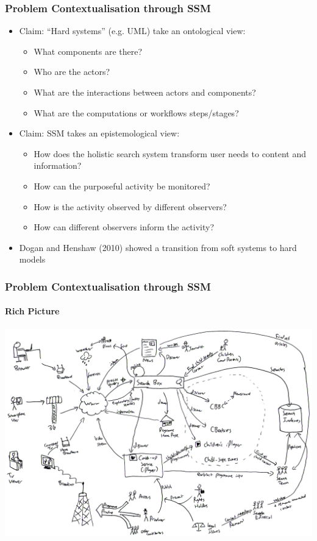 \documentclass{beamer}
\begin{document}
\begin{frame}
  \frametitle{Problem Contextualisation through SSM}
  \begin{itemize}
    \item Claim: ``Hard systems'' (e.g. UML) take an ontological view:
    \begin{itemize}
      \item What components are there?
      \item Who are the actors?
      \item What are the interactions between actors and components?
      \item What are the computations or workflows steps/stages?
    \end{itemize}
    \pause \item Claim: SSM takes an epistemological view:
    \begin{itemize}
      \item How does the holistic search system transform user needs to content and information?
      \item How can the purposeful activity be monitored?
      \item How is the activity observed by different observers?
      \item How can different observers inform the activity?
    \end{itemize}
    \pause \item Dogan and Henshaw (2010) showed a transition from soft systems to hard models
  \end{itemize}
\end{frame}

\begin{frame} 
  \frametitle{Problem Contextualisation through SSM}
  \framesubtitle{Rich Picture}
  \pause \includegraphics[width=\linewidth]{rich-picture.png}
\end{frame}
\end{document}
